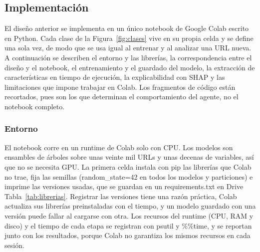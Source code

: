 \subsection{Implementación}

El diseño anterior se implementa en un único notebook de Google Colab escrito en Python. Cada clase de la Figura~\ref{fig:clases} vive en su propia celda y se define una sola vez, de modo que se usa igual al entrenar y al analizar una URL nueva. A continuación se describen el entorno y las librerías, la correspondencia entre el diseño y el notebook, el entrenamiento y el guardado del modelo, la extracción de características en tiempo de ejecución, la explicabilidad con SHAP y las limitaciones que impone trabajar en Colab. Los fragmentos de código están recortados, pues son los que determinan el comportamiento del agente, no el notebook completo. \newline

\subsubsection{Entorno}

El notebook corre en un runtime de Colab solo con CPU. Los modelos son ensambles de árboles sobre unas veinte mil URLs y unas decenas de variables, así que no se necesita GPU. La primera celda instala con pip las librerías que Colab no trae, fija las semillas (random\_state=42 en todos los modelos y particiones) e imprime las versiones usadas, que se guardan en un requirements.txt en Drive Tabla~\ref{tab:librerias}. Registrar las versiones tiene una razón práctica, Colab actualiza sus librerías preinstaladas con el tiempo, y un modelo guardado con una versión puede fallar al cargarse con otra. Los recursos del runtime (CPU, RAM y disco) y el tiempo de cada etapa se registran con psutil y \%\%time, y se reportan junto con los resultados, porque Colab no garantiza los mismos recursos en cada sesión. \newline

